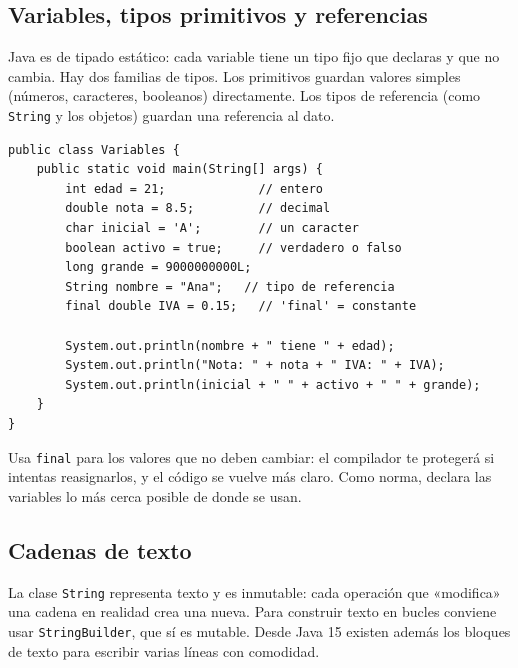 \documentclass[11pt]{article}
\begin{document}
\subsection{Variables, tipos primitivos y referencias}
Java es de tipado estático: cada variable tiene un tipo fijo que declaras y que no cambia. Hay dos familias de tipos. Los primitivos guardan valores simples (números, caracteres, booleanos) directamente. Los tipos de referencia (como \texttt{String} y los objetos) guardan una referencia al dato.

\begin{cajacodigo}
\begin{lstlisting}[style=java]
public class Variables {
    public static void main(String[] args) {
        int edad = 21;             // entero
        double nota = 8.5;         // decimal
        char inicial = 'A';        // un caracter
        boolean activo = true;     // verdadero o falso
        long grande = 9000000000L;
        String nombre = "Ana";   // tipo de referencia
        final double IVA = 0.15;   // 'final' = constante

        System.out.println(nombre + " tiene " + edad);
        System.out.println("Nota: " + nota + " IVA: " + IVA);
        System.out.println(inicial + " " + activo + " " + grande);
    }
}
\end{lstlisting}
\end{cajacodigo}
\vspace{2pt}
Usa \texttt{final} para los valores que no deben cambiar: el compilador te protegerá si intentas reasignarlos, y el código se vuelve más claro. Como norma, declara las variables lo más cerca posible de donde se usan.

\subsection{Cadenas de texto}
La clase \texttt{String} representa texto y es inmutable: cada operación que «modifica» una cadena en realidad crea una nueva. Para construir texto en bucles conviene usar \texttt{String\allowbreak{}Builder}, que sí es mutable. Desde Java 15 existen además los bloques de texto para escribir varias líneas con comodidad.
\end{document}
